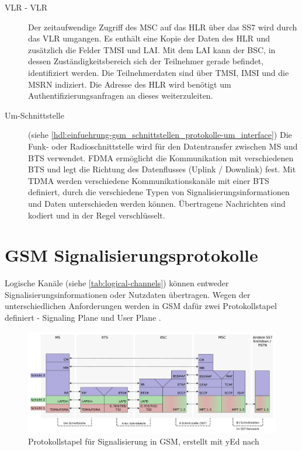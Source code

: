 \begin{description}
\item[\acs{VLR} - \acl{VLR}] Der zeitaufwendige Zugriff des \ac{MSC} auf das \ac{HLR} über das \ac{SS7} wird durch das \ac{VLR} umgangen. Es enthält eine Kopie der Daten des \ac{HLR} und zusätzlich die Felder \ac{TMSI} und \ac{LAI}. Mit dem \ac{LAI} kann der \ac{BSC}, in dessen Zuständigkeitsbereich sich der Teilnehmer gerade befindet, identifiziert werden. Die Teilnehmerdaten sind über \ac{TMSI}, \ac{IMSI} und die \ac{MSRN} indiziert. Die Adresse des \ac{HLR} wird benötigt um Authentifizierungsanfragen an dieses weiterzuleiten.
\item[\acs{Um}-Schnittstelle] (siehe \autoref{hdl:einfuehrung-gsm_schnittstellen_protokolle-um_interface})
Die Funk- oder Radioschnittstelle wird für den Datentransfer zwischen \ac{MS} und \ac{BTS} verwendet. \ac{FDMA} ermöglicht die Kommunikation mit verschiedenen \ac{BTS} und legt die Richtung des Datenflusses (Uplink / Downlink) fest. Mit \ac{TDMA} werden verschiedene Kommunikationskanäle mit einer \ac{BTS} definiert, durch die verschiedene Typen von Signalisierungsinformationen und Daten unterschieden werden können. Übertragene Nachrichten sind kodiert und in der Regel verschlüsselt.
\end{description}

\section{GSM Signalisierungsprotokolle} \label{hdl:einfuehrung-gsm_schnittstellen_protokolle}

Logische Kanäle (siehe \autoref{tab:logical-channels}) können entweder Signalisierungsinformationen oder Nutzdaten übertragen. Wegen der unterschiedlichen Anforderungen werden in \ac{GSM} dafür zwei Protokollstapel definiert - Signaling Plane und User Plane \cite[Kap. 5.2, 5.3]{eberspacher:2008:gsm-architecture}.

\begin{figure}[H]
  \begin{center}
    \includegraphics[width=1.0\textwidth]{figures/gsm_protocol_stack.pdf}
  \end{center}
  \caption[Protokollstapel für Signalisierung in GSM]{Protokollstapel für Signalisierung in \ac{GSM}, erstellt mit yEd nach \citep{eberspacher:2008:gsm-architecture}} \label{fig:gsm-protocol-stack} 
\end{figure}


